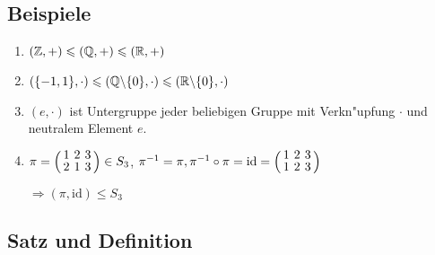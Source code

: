 \subsection{Beispiele}
\begin{enumerate}
	\item
	$(\mathbb{Z}, +) \leqslant (\mathbb{Q}, +) \leqslant (\mathbb{R}, +)$
	
	\item
	$(\{-1,1\}, \cdot) \leqslant (\mathbb{Q} \backslash \{0\}, \cdot) \leqslant (\mathbb{R} \backslash \{0\}, \cdot)$
	
	\item
	$(e, \cdot)$ ist Untergruppe jeder beliebigen Gruppe mit Verkn"upfung $\cdot$ und neutralem Element $e$.
	
	\item
	$\pi =
	\aMatrix{ccc}{
		1 & 2 & 3 \\
		2 & 1 & 3
		}
	\in S_3
	$,
	$\pi^{-1} = \pi, \pi^{-1} \circ \pi = \text{id} =
	\aMatrix{ccc}{
		1 & 2 & 3 \\
		1 & 2 & 3
		}
	$
	
	$\Rightarrow (\pi, \text{id})\leqslant S_3$
	
\end{enumerate}

\subsection[Satz und Definition: Rechtsnebenklassen]{Satz und Definition}
\label{rechtsnebenklassen}
	
